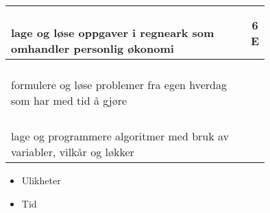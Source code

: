 \begin{center}
\begin{tabular}{p{10.5cm} | c | c}
\shortstack[l]{\\lage og løse oppgaver i regneark som \\omhandler personlig økonomi
} &\shortstack{} &\shortstack{6\\E} \\ \hline

\shortstack[l]{\\formulere og løse problemer fra egen hverdag\\ som har med tid å gjøre
} &\shortstack{} &\shortstack{} \\ \hline

\shortstack[l]{\\lage og programmere algoritmer med bruk av \\variabler, vilkår og løkker
} &\shortstack{} &\shortstack{} \\ \hline
\end{tabular}

\begin{itemize}
	\item Ulikheter
	\item Tid
\end{itemize}
\end{center}

